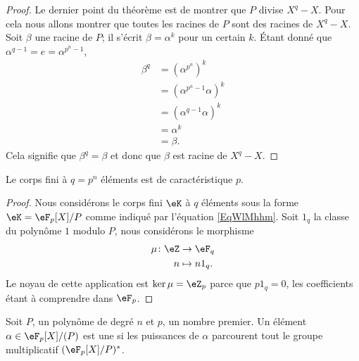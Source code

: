 \begin{proof}
    Le dernier point du théorème est de montrer que \( P\) divise \( X^q-X\). Pour cela nous allons montrer que toutes les racines de \( P\) sont des racines de \( X^q-X\). Soit \( \beta\) une racine de \( P\); il s'écrit \( \beta=\alpha^k\) pour un certain \( k\). Étant donné que \( \alpha^{q-1}=e=\alpha^{p^n-1}\),
    \begin{subequations}
        \begin{align}
            \beta^q&=(\alpha^{p^n})^k\\
            &=\left( \alpha^{p^n-1}\alpha \right)^k\\
            &=\left( \alpha^{q-1}\alpha \right)^k\\
            &=\alpha^k\\
            &=\beta.
        \end{align}
    \end{subequations}
    Cela signifie que \( \beta^q=\beta\) et donc que \( \beta\) est racine de \( X^q-X\).
\end{proof}

\begin{corollary}
    Le corps fini à \( q=p^n\) éléments est de caractéristique \( p\).
\end{corollary}

\begin{proof}
    Nous considérons le corps fini \( \eK\) à \( q\) éléments sous la forme \( \eK=\eF_p[X]/P\) comme indiqué par l'équation \eqref{EqWlMhhm}. Soit \( 1_q\) la classe du polynôme \( 1\) modulo \( P\), nous considérons le morphisme
    \begin{equation}
        \begin{aligned}
            \mu\colon \eZ&\to \eF_q \\
            n&\mapsto n1_q. 
        \end{aligned}
    \end{equation}
    Le noyau de cette application est \( \ker\mu=\eZ_p\) parce que \( p1_q=0\), les coefficients étant à comprendre dans \( \eF_p\).
\end{proof}

\begin{definition}  \label{DefnPNCFO}
    Soit \( P\), un polynôme de degré \( n\) et \( p\), un nombre premier. Un élément \( \alpha\in \eF_p[X]/(P)\) est une  si les puissances de \( \alpha\) parcourent tout le groupe multiplicatif \( (\eF_p[X]/P)^*\).
\end{definition}

